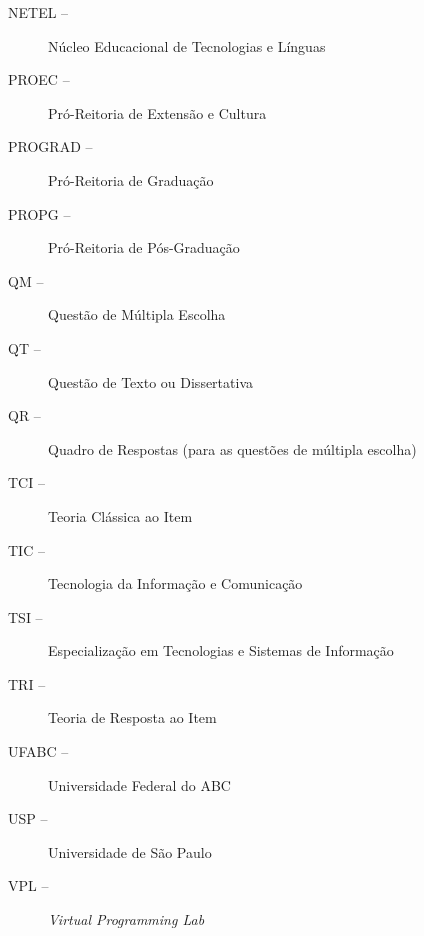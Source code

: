 \begin{description}
  \item[NETEL --] Núcleo Educacional de Tecnologias e Línguas 
  \item[PROEC --] Pró-Reitoria de Extensão e Cultura
  \item[PROGRAD --] Pró-Reitoria de Graduação
  \item[PROPG --] Pró-Reitoria de Pós-Graduação
  \item[QM --] Questão de Múltipla Escolha
  \item[QT --] Questão de Texto ou Dissertativa
  \item[QR --] Quadro de Respostas (para as questões de múltipla escolha)
  \item[TCI --]  Teoria Clássica ao Item
  \item[TIC --] Tecnologia da Informação e Comunicação
  \item[TSI --] Especialização em Tecnologias e Sistemas de Informação 
  \item[TRI --]  Teoria de Resposta ao Item
  \item[UFABC --] Universidade Federal do ABC
  \item[USP --] Universidade de São Paulo
  \item[VPL --] \textit{Virtual Programming Lab}
\end{description}
